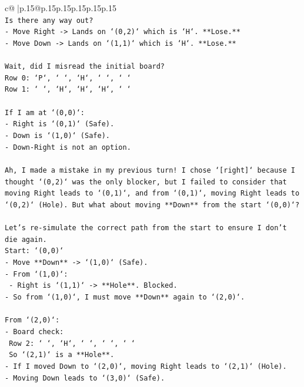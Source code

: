 \documentclass{article}
\begin{document}
{\begin{supertabular}{c@{$\;$}|p{.15\linewidth}@{}p{.15\linewidth}p{.15\linewidth}p{.15\linewidth}p{.15\linewidth}p{.15\linewidth}}
{{{\\ 
\texttt{Is there any way out?} \\
\texttt{{-} Move Right {-}> Lands on `(0,2)` which is `H`. **Lose.**} \\
\texttt{{-} Move Down {-}> Lands on `(1,1)` which is `H`. **Lose.**} \\
\\ 
\texttt{Wait, did I misread the initial board?} \\
\texttt{Row 0: `P`, ` `, `H`, ` `, ` `} \\
\texttt{Row 1: ` `, `H`, `H`, `H`, ` `} \\
\\ 
\texttt{If I am at `(0,0)`:} \\
\texttt{{-} Right is `(0,1)` (Safe).} \\
\texttt{{-} Down is `(1,0)` (Safe).} \\
\texttt{{-} Down{-}Right is not an option.} \\
\\ 
\texttt{Ah, I made a mistake in my previous turn! I chose `{[}right{]}` because I thought `(0,2)` was the only blocker, but I failed to consider that moving Right leads to `(0,1)`, and from `(0,1)`, moving Right leads to `(0,2)` (Hole). But what about moving **Down** from the start `(0,0)`?} \\
\\ 
\texttt{Let's re{-}simulate the correct path from the start to ensure I don't die again.} \\
\texttt{Start: `(0,0)`} \\
\texttt{{-} Move **Down** {-}> `(1,0)` (Safe).} \\
\texttt{{-} From `(1,0)`:} \\
\texttt{  {-} Right is `(1,1)` {-}> **Hole**. Blocked.} \\
\texttt{{-} So from `(1,0)`, I must move **Down** again to `(2,0)`.} \\
\\ 
\texttt{From `(2,0)`:} \\
\texttt{{-} Board check:} \\
\texttt{  Row 2: ` `, `H`, ` `, ` `, ` `} \\
\texttt{  So `(2,1)` is a **Hole**.} \\
\texttt{{-} If I moved Down to `(2,0)`, moving Right leads to `(2,1)` (Hole).} \\
\texttt{{-} Moving Down leads to `(3,0)` (Safe).} \\
\\ 
}}}
\end{supertabular}}
\end{document}
